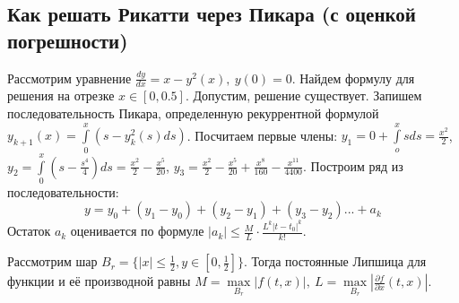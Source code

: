 \subsection{Как решать Рикатти через Пикара (с оценкой погрешности)}
Рассмотрим уравнение $\frac{dy}{dx}=x-y^2(x),~y(0)=0$. Найдем формулу
для решения на отрезке $x\in [0,0.5]$.
Допустим, решение существует. Запишем последовательность Пикара, определенную
рекуррентной формулой $y_{k+1}(x)=\int\limits_{0}^{x}(s-y^2_k(s)ds)$.
Посчитаем первые члены: $y_1=0+\int\limits_{o}^{x}sds=\frac{x^2}{2}$,
$y_2=\int\limits_{0}^{x}\left( s-\frac{s^4}{4}\right)ds=\frac{x^2}{2}-
\frac{x^5}{20}$, $y_3=\frac{x^2}{2}-\frac{x^5}{20}+\frac{x^8}{160}-
\frac{x^{11}}{4400}$. Построим ряд из последовательности:
$$y=y_0+(y_1-y_0)+(y_2-y_1)+(y_3-y_2)...+a_k$$ 
Остаток $a_k$ оценивается по формуле  $|a_k|\leqslant \frac{M}{L}\cdot 
\frac{L^k|t-t_0|^k}{k!}$. 

Рассмотрим шар $B_r=\{|x|\leqslant \frac{1}{2},y\in [0,\frac{1}{2}]\}$. 
Тогда постоянные Липшица для функции и её производной равны
$M=\max\limits_{B_r}|f(t,x)|,~
L=\max\limits_{B_r}|\frac{\partial f}{\partial x} (t,x)|$. 

